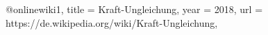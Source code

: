 @online{wiki1,
title = {Kraft-Ungleichung},
year = {2018},
url = {https://de.wikipedia.org/wiki/Kraft-Ungleichung},
}
